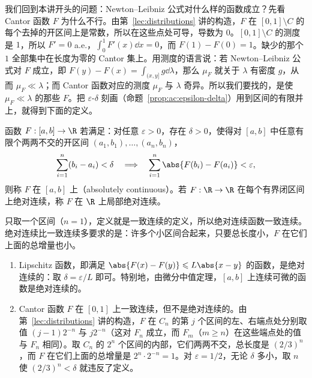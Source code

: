 
我们回到本讲开头的问题：Newton--Leibniz 公式对什么样的函数成立？先看 Cantor 函数 $F$ 为什么不行。由第~\ref{lec:distributions} 讲的构造，$F$ 在 $[0,1]\setminus C$ 的每个去掉的开区间上是常数，所以在这些点处可导，导数为 $0$。$[0,1]\setminus C$ 的测度是 $1$，所以 $F'=0$ a.e.，$\int_0^1F'(x)\dd x=0$，而 $F(1)-F(0)=1$。缺少的那个 $1$ 全部集中在长度为零的 Cantor 集上。用测度的语言说：若 Newton--Leibniz 公式对 $F$ 成立，即 $F(y)-F(x)=\int_{(x,y]}g\dd\lambda$，那么 $\mu_F$ 就关于 $\lambda$ 有密度 $g$，从而 $\mu_F\ll\lambda$；而 Cantor 函数对应的测度 $\mu_F$ 与 $\lambda$ 奇异。所以我们要找的，是使 $\mu_F\ll\lambda$ 的那些 $F$。把 $\varepsilon$-$\delta$ 刻画（命题~\ref{prop:ac:epsilon-delta}）用到区间的有限并上，就得到下面的定义。

\begin{definition}[绝对连续函数]\label{def:ac:ac-function}
函数 $F:[a,b]\to\R$ 若满足：对任意 $\varepsilon>0$，存在 $\delta>0$，使得对 $[a,b]$ 中任意有限个两两不交的开区间 $(a_1,b_1),\dots,(a_n,b_n)$，
\[
\sum_{i=1}^n(b_i-a_i)<\delta\quad\Longrightarrow\quad\sum_{i=1}^n\abs{F(b_i)-F(a_i)}<\varepsilon,
\]
则称 $F$ 在 $[a,b]$ 上（absolutely continuous）。若 $F:\R\to\R$ 在每个有界闭区间上绝对连续，称 $F$ 在 $\R$ 上局部绝对连续。
\end{definition}

只取一个区间（$n=1$），定义就是一致连续的定义，所以绝对连续函数一致连续。绝对连续比一致连续多要求的是：许多个小区间合起来，只要总长度小，$F$ 在它们上面的总增量也小。

\begin{example}\label{ex:ac:ac-functions}
\begin{enumerate}
\item Lipschitz 函数，即满足 $\abs{F(x)-F(y)}\leqslant L\abs{x-y}$ 的函数，是绝对连续的：取 $\delta=\varepsilon/L$ 即可。特别地，由微分中值定理，$[a,b]$ 上连续可微的函数是绝对连续的。
\item Cantor 函数 $F$ 在 $[0,1]$ 上一致连续，但不是绝对连续的。由第~\ref{lec:distributions} 讲的构造，$F$ 在 $C_n$ 的第 $j$ 个区间的左、右端点处分别取值 $(j-1)2^{-n}$ 与 $j2^{-n}$（这对 $F_n$ 成立，而 $F_m$（$m\geqslant n$）在这些端点处的值与 $F_n$ 相同）。取 $C_n$ 的 $2^n$ 个区间的内部，它们两两不交，总长度是 $(2/3)^n$，而 $F$ 在它们上面的总增量是 $2^n\cdot2^{-n}=1$。对 $\varepsilon=1/2$，无论 $\delta$ 多小，取 $n$ 使 $(2/3)^n<\delta$ 就违反了定义。
\end{enumerate}
\end{example}

